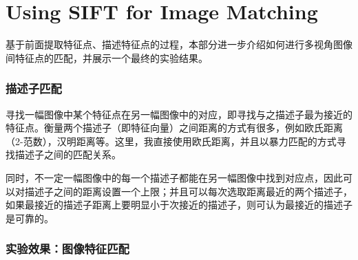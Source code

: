 \part{Using SIFT for Image Matching}\label{part:Matching descriptors}

基于前面提取\sift 特征点、描述\sift 特征点的过程，本部分进一步介绍如何进行多视角图像间特征点的匹配，并展示一个最终的实验结果。

\section{描述子匹配}

寻找一幅图像中某个特征点在另一幅图像中的对应，即寻找与之描述子最为接近的特征点。衡量两个描述子（即特征向量）之间距离的方式有很多，例如欧氏距离（2-范数），汉明距离等。这里，我直接使用欧氏距离，并且以暴力匹配的方式寻找描述子之间的匹配关系。

同时，不一定一幅图像中的每一个描述子都能在另一幅图像中找到对应点，因此可以对描述子之间的距离设置一个上限；并且可以每次选取距离最近的两个描述子，如果最接近的描述子距离上要明显小于次接近的描述子，则可认为最接近的描述子是可靠的。

\section{实验效果：图像特征匹配}
